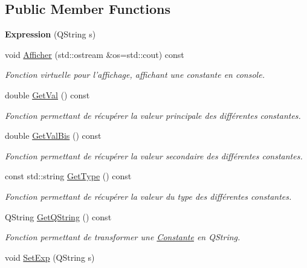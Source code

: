 \subsection*{Public Member Functions}
\begin{DoxyCompactItemize}
\item 
\hypertarget{class_expression_ac25fb301ae3947c964a4da9a95883e72}{{\bfseries Expression} (Q\-String s)}\label{class_expression_ac25fb301ae3947c964a4da9a95883e72}

\item 
void \hyperlink{class_expression_a82c745bad73c0adf286f893febaf7406}{Afficher} (std\-::ostream \&os=std\-::cout) const 
\begin{DoxyCompactList}\small\item\em Fonction virtuelle pour l'affichage, affichant une constante en console. \end{DoxyCompactList}\item 
double \hyperlink{class_expression_addc8118b94c445af0da80e8e661dfd6a}{Get\-Val} () const 
\begin{DoxyCompactList}\small\item\em Fonction permettant de récupérer la valeur principale des différentes constantes. \end{DoxyCompactList}\item 
double \hyperlink{class_expression_ad602729011040226673d7c1ee94367d9}{Get\-Val\-Bis} () const 
\begin{DoxyCompactList}\small\item\em Fonction permettant de récupérer la valeur secondaire des différentes constantes. \end{DoxyCompactList}\item 
const std\-::string \hyperlink{class_expression_aa96b1065b6d35277b2c30c25966eccfb}{Get\-Type} () const 
\begin{DoxyCompactList}\small\item\em Fonction permettant de récupérer la valeur du type des différentes constantes. \end{DoxyCompactList}\item 
Q\-String \hyperlink{class_expression_ab64fbbad486a07035ada97ae21786db4}{Get\-Q\-String} () const 
\begin{DoxyCompactList}\small\item\em Fonction permettant de transformer une \hyperlink{class_constante}{Constante} en Q\-String. \end{DoxyCompactList}\item 
\hypertarget{class_expression_accbdcaab3d8ffc239d83618d49574733}{void \hyperlink{class_expression_accbdcaab3d8ffc239d83618d49574733}{Set\-Exp} (Q\-String s)}\label{class_expression_accbdcaab3d8ffc239d83618d49574733}


\end{DoxyCompactItemize}
